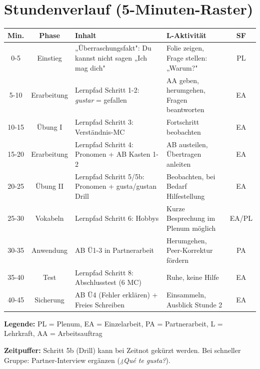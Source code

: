 \documentclass[10pt, a4paper]{article}
\newcommand{\es}[1]{\textcolor{spanisch}{\textit{#1}}}
\begin{document}

\section{Stundenverlauf (5-Minuten-Raster)}

\small
\begin{tabularx}{\textwidth}{|c|c|X|X|c|}
    \hline
    \textbf{Min.} & \textbf{Phase} & \textbf{Inhalt} & \textbf{L-Aktivität} & \textbf{SF} \\
    \hline
    0-5 & Einstieg & „Überraschungsfakt": Du kannst nicht sagen „Ich mag dich" & Folie zeigen, Frage stellen: „Warum?" & PL \\
    \hline
    5-10 & Erarbeitung & Lernpfad Schritt 1-2: \es{gustar} = gefallen & AA geben, herumgehen, Fragen beantworten & EA \\
    \hline
    10-15 & Übung I & Lernpfad Schritt 3: Verständnis-MC & Fortschritt beobachten & EA \\
    \hline
    15-20 & Erarbeitung & Lernpfad Schritt 4: Pronomen + AB Kasten 1-2 & AB austeilen, Übertragen anleiten & EA \\
    \hline
    20-25 & Übung II & Lernpfad Schritt 5/5b: Pronomen + gusta/gustan Drill & Beobachten, bei Bedarf Hilfestellung & EA \\
    \hline
    25-30 & Vokabeln & Lernpfad Schritt 6: Hobbys & Kurze Besprechung im Plenum möglich & EA/PL \\
    \hline
    30-35 & Anwendung & AB Ü1-3 in Partnerarbeit & Herumgehen, Peer-Korrektur fördern & PA \\
    \hline
    35-40 & Test & Lernpfad Schritt 8: Abschlusstest (6 MC) & Ruhe, keine Hilfe & EA \\
    \hline
    40-45 & Sicherung & AB Ü4 (Fehler erklären) + Freies Schreiben & Einsammeln, Ausblick Stunde 2 & EA \\
    \hline
\end{tabularx}
\normalsize

\textbf{Legende:} PL = Plenum, EA = Einzelarbeit, PA = Partnerarbeit, L = Lehrkraft, AA = Arbeitsauftrag

\vspace{4pt}

\begin{warnbox}
\textbf{Zeitpuffer:} Schritt 5b (Drill) kann bei Zeitnot gekürzt werden. Bei schneller Gruppe: Partner-Interview ergänzen (\es{¿Qué te gusta?}).
\end{warnbox}
\end{document}
